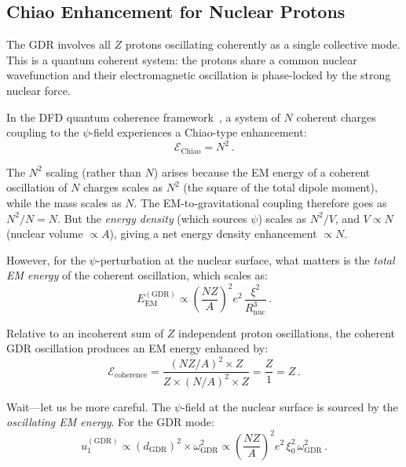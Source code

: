 \documentclass[aps,prd,twocolumn,superscriptaddress,nofootinbib]{revtex4-2}
\newcommand{\wGDR}{\omega_{\mathrm{GDR}}}
\newcommand{\Rnuc}{R_{\mathrm{nuc}}}
\begin{document}
\subsection{Chiao Enhancement for Nuclear Protons}
\label{sec:chiao}

The GDR involves all $Z$ protons oscillating coherently as a single
collective mode.  This is a quantum coherent system: the protons
share a common nuclear wavefunction and their electromagnetic
oscillation is phase-locked by the strong nuclear force.

In the DFD quantum coherence framework~\cite{Alcock2026Core}, a
system of $N$ coherent charges coupling to the $\psi$-field
experiences a Chiao-type enhancement:
\begin{equation}\label{eq:chiao}
\mathcal{E}_{\mathrm{Chiao}} = N^2\,.
\end{equation}

The $N^2$ scaling (rather than $N$) arises because the EM energy of a
coherent oscillation of $N$ charges scales as $N^2$ (the square of
the total dipole moment), while the mass scales as $N$.  The
EM-to-gravitational coupling therefore goes as $N^2/N = N$.  But the
\emph{energy density} (which sources $\psi$) scales as $N^2/V$, and
$V \propto N$ (nuclear volume $\propto A$), giving a net energy
density enhancement $\propto N$.

However, for the $\psi$-perturbation at the nuclear surface, what
matters is the \emph{total EM energy} of the coherent oscillation,
which scales as:
\begin{equation}
E_{\mathrm{EM}}^{(\mathrm{GDR})} \propto
\left(\frac{NZ}{A}\right)^2 e^2\,\frac{\xi^2}{\Rnuc^3}\,.
\end{equation}

Relative to an incoherent sum of $Z$ independent proton oscillations,
the coherent GDR oscillation produces an EM energy enhanced by:
\begin{equation}\label{eq:coherence-factor}
\mathcal{E}_{\mathrm{coherence}} = \frac{(NZ/A)^2 \times Z}{Z \times (N/A)^2 \times Z}
= \frac{Z}{1} = Z\,.
\end{equation}

Wait---let us be more careful.  The $\psi$-field at the nuclear
surface is sourced by the \emph{oscillating EM energy}.  For the
GDR mode:
\begin{equation}
u_1^{(\mathrm{GDR})} \propto (d_{\mathrm{GDR}})^2 \times \wGDR^2
\propto \left(\frac{NZ}{A}\right)^2 e^2\,\xi_0^2\,\wGDR^2\,.
\end{equation}
\end{document}
